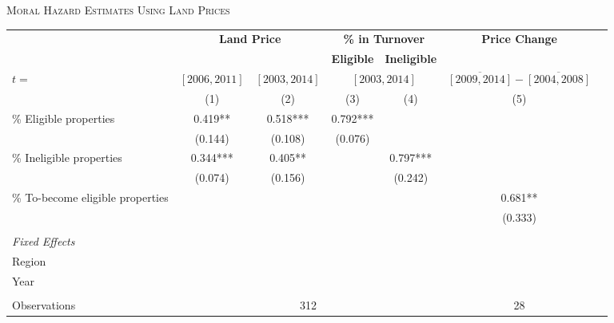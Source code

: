 \documentclass[12pt]{article}
\begin{document}
 \begin{center}
 \begin{threeparttable}[b]
 \singlespacing
 \footnotesize
    	\caption{\textsc{Moral Hazard Estimates Using Land Prices}}
\setlength{\tabcolsep}{3.5pt}
\begin{tabular}{l*{6}c}  \midrule \midrule
& \multicolumn{2}{c}{\textbf{Land Price}}  & \multicolumn{2}{c}{\textbf{\% in Turnover}} & \textbf{Price Change} \\
& & &  \textbf{Eligible} & \textbf{Ineligible} 
\\\cmidrule{2-3} \cmidrule{4-5} \cmidrule{6-7}
$t=$ &   $\left[2006, 2011\right]$ &  $\left[2003, 2014\right]$ &  \multicolumn{2}{c}{$\left[2003, 2014\right]$} & \multicolumn{1}{c}{$\overline{\left[2009, 2014\right]}-\overline{\left[2004, 2008\right]}$} &  \\  
  & (1) & (2) & (3) & (4) & (5)      \\
   \midrule
  \% Eligible properties & 0.419** &  0.518*** &     0.792***  \\ 
  &  (0.144) &   (0.108) &   (0.076)  \\ 
   \% Ineligible properties & 0.344*** & 0.405** & &  0.797*** \\ 
  &   (0.074)  & (0.156) &&  (0.242) \\ 
\% To-become eligible properties & & & & & 0.681**  \\
& &&&& (0.333) \\
\\ \midrule
\textit{Fixed Effects} \\
\quad Region & \cellcolor{green!50} & \cellcolor{green!50}    \\
\quad Year  & \cellcolor{green!50} & \cellcolor{green!50}   & \cellcolor{green!50} & \cellcolor{green!50} \\
& \\
Observations & \multicolumn{4}{c}{312} &    \multicolumn{1}{c}{28}   \\
   \midrule \midrule
	\end{tabular}
			\begin{tablenotes}[flushleft]

\end{tablenotes}
\end{threeparttable}
\end{center}
\end{document}

